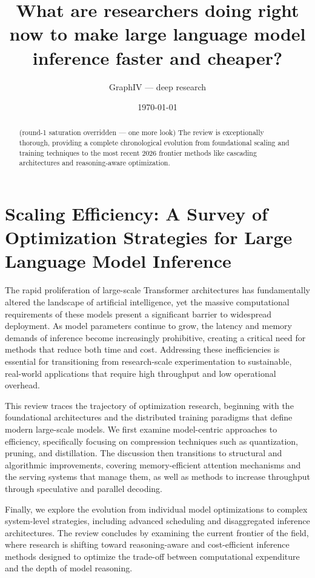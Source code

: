 \documentclass[11pt]{article}
\title{What are researchers doing right now to make large language model inference faster and cheaper?}
\author{GraphIV --- deep research}
\date{\today}
\begin{document}
\maketitle

\begin{abstract}
(round-1 saturation overridden — one more look) The review is exceptionally thorough, providing a complete chronological evolution from foundational scaling and training techniques to the most recent 2026 frontier methods like cascading architectures and reasoning-aware optimization.
\end{abstract}

\section{Scaling Efficiency: A Survey of Optimization Strategies for Large Language Model Inference}

The rapid proliferation of large-scale Transformer architectures has fundamentally altered the landscape of artificial intelligence, yet the massive computational requirements of these models present a significant barrier to widespread deployment. As model parameters continue to grow, the latency and memory demands of inference become increasingly prohibitive, creating a critical need for methods that reduce both time and cost. Addressing these inefficiencies is essential for transitioning from research-scale experimentation to sustainable, real-world applications that require high throughput and low operational overhead.

This review traces the trajectory of optimization research, beginning with the foundational architectures and the distributed training paradigms that define modern large-scale models. We first examine model-centric approaches to efficiency, specifically focusing on compression techniques such as quantization, pruning, and distillation. The discussion then transitions to structural and algorithmic improvements, covering memory-efficient attention mechanisms and the serving systems that manage them, as well as methods to increase throughput through speculative and parallel decoding.

Finally, we explore the evolution from individual model optimizations to complex system-level strategies, including advanced scheduling and disaggregated inference architectures. The review concludes by examining the current frontier of the field, where research is shifting toward reasoning-aware and cost-efficient inference methods designed to optimize the trade-off between computational expenditure and the depth of model reasoning.
\end{document}
